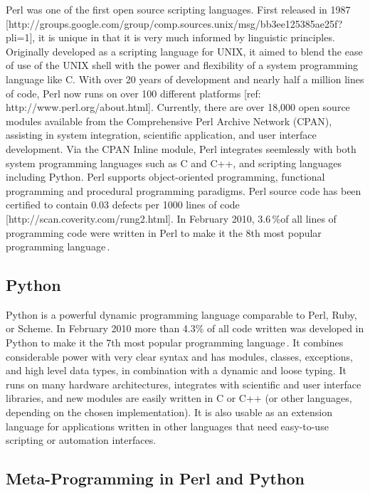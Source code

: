 \documentclass[12pt]{article}
\begin{document}
Perl was one of the first open source scripting languages. First
released in 1987
[http://groups.google.com/group/comp.sources.unix/msg/bb3ee125385ae25f?pli=1],
it is unique in that it is very much informed by linguistic
principles.  Originally developed as a scripting language for UNIX, it
aimed to blend the ease of use of the UNIX shell with the power and
flexibility of a system programming language like C.  With over 20
years of development and nearly half a million lines of code, Perl now
runs on over 100 different platforms [ref:
http://www.perl.org/about.html].  Currently, there are over 18,000
open source modules available from the Comprehensive Perl Archive
Network (CPAN), assisting in system integration, scientific
application, and user interface development.  Via the CPAN Inline
module, Perl integrates seemlessly with both system programming
languages such as C and C++, and scripting languages including Python.
Perl supports object-oriented programming, functional programming and
procedural programming paradigms.  Perl source code has been certified
to contain 0.03 defects per 1000 lines of code
[http://scan.coverity.com/rung2.html].  In February 2010,
3.6\,\%of all lines of programming code were written in Perl to make
it the 8th most popular programming
language\,\cite{software09:_tiobe_progr_commun_index}.

\subsection{Python}

Python is a powerful dynamic programming language comparable to Perl,
Ruby, or Scheme.  In February 2010 more than 4.3\% of all code written was
developed in Python to make it the 7th most popular programming
language\,\cite{software09:_tiobe_progr_commun_index}. It combines
considerable power with very clear syntax and has modules, classes,
exceptions, and high level data types, in combination with a dynamic
and loose typing. It runs on many hardware architectures, integrates
with scientific and user interface libraries, and new modules are
easily written in C or C++ (or other languages, depending on the
chosen implementation). It is also usable as an extension language for
applications written in other languages that need easy-to-use
scripting or automation interfaces.


\subsection{Meta-Programming in Perl and Python}
\end{document}
